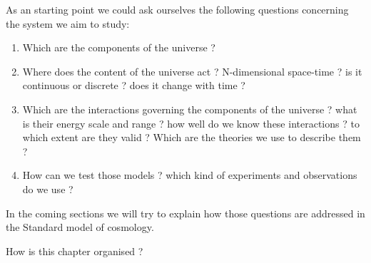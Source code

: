 As an starting point we could ask ourselves the following questions concerning the system we aim to study:

\begin{enumerate}
\item Which are the components of the universe ?
\item Where does the content of the universe act ? N-dimensional space-time ? is it continuous or discrete ?  does it change with time ?
\item Which  are the interactions governing the components of the universe ? what is their energy scale and range ? how well do we know these interactions ? to which extent are they valid ? Which are the theories we use to describe them ?
\item How can we test those models ? which kind of experiments and observations do we use ? 
\end{enumerate}

In the coming sections we will try to explain how those questions are addressed in the Standard model of cosmology. 





How is this chapter organised ?

